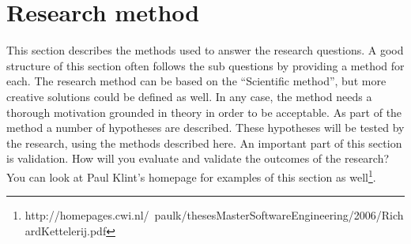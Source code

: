 \chapter{Research method}
This section describes the methods used to answer the research questions. A
good structure of this section often follows the sub questions by providing a
method for each.
The research method can be based on the “Scientific method”, but more creative
solutions could be defined as well. In any case, the method needs a thorough
motivation grounded in theory in order to be acceptable.
As part of the method a number of hypotheses are described. These hypotheses
will be tested by the research, using the methods described here.
An important part of this section is validation. How will you evaluate and
validate the outcomes of the research? You can look at Paul Klint’s homepage
for examples of this section as
well\footnote{http://homepages.cwi.nl/~paulk/thesesMasterSoftwareEngineering/2006/RichardKettelerij.pdf}.
